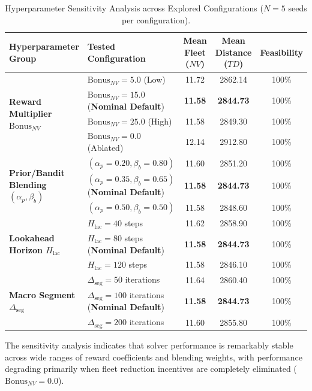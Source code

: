 \documentclass{article}
\begin{document}
\begin{table}[!htbp]
\caption{Hyperparameter Sensitivity Analysis across Explored Configurations ($N=5$ seeds per configuration).}
\label{tab:supp_sensitivity_matrix}
\centering
\small
\begin{tabularx}{\textwidth}{l l c c c}
\toprule
\textbf{Hyperparameter Group} & \textbf{Tested Configuration} & \textbf{Mean Fleet ($NV$)} & \textbf{Mean Distance ($TD$)} & \textbf{Feasibility} \\
\midrule
\multirow{4}{*}{\textbf{Reward Multiplier $\text{Bonus}_{NV}$}} 
 & $\text{Bonus}_{NV} = 5.0$ (Low) & 11.72 & 2862.14 & 100\% \\
 & $\text{Bonus}_{NV} = 15.0$ (\textbf{Nominal Default}) & \textbf{11.58} & \textbf{2844.73} & 100\% \\
 & $\text{Bonus}_{NV} = 25.0$ (High) & 11.58 & 2849.30 & 100\% \\
 & $\text{Bonus}_{NV} = 0.0$ (Ablated) & 12.14 & 2912.80 & 100\% \\
\midrule
\multirow{3}{*}{\textbf{Prior/Bandit Blending $(\alpha_p, \beta_b)$}} 
 & $(\alpha_p=0.20, \beta_b=0.80)$ & 11.60 & 2851.20 & 100\% \\
 & $(\alpha_p=0.35, \beta_b=0.65)$ (\textbf{Nominal Default}) & \textbf{11.58} & \textbf{2844.73} & 100\% \\
 & $(\alpha_p=0.50, \beta_b=0.50)$ & 11.58 & 2848.60 & 100\% \\
\midrule
\multirow{3}{*}{\textbf{Lookahead Horizon $H_{\text{lac}}$}} 
 & $H_{\text{lac}} = 40$ steps & 11.62 & 2858.90 & 100\% \\
 & $H_{\text{lac}} = 80$ steps (\textbf{Nominal Default}) & \textbf{11.58} & \textbf{2844.73} & 100\% \\
 & $H_{\text{lac}} = 120$ steps & 11.58 & 2846.10 & 100\% \\
\midrule
\multirow{3}{*}{\textbf{Macro Segment $\Delta_{\text{seg}}$}} 
 & $\Delta_{\text{seg}} = 50$ iterations & 11.64 & 2860.40 & 100\% \\
 & $\Delta_{\text{seg}} = 100$ iterations (\textbf{Nominal Default}) & \textbf{11.58} & \textbf{2844.73} & 100\% \\
 & $\Delta_{\text{seg}} = 200$ iterations & 11.60 & 2855.80 & 100\% \\
\bottomrule
\end{tabularx}
\end{table}

The sensitivity analysis indicates that solver performance is remarkably stable across wide ranges of reward coefficients and blending weights, with performance degrading primarily when fleet reduction incentives are completely eliminated ($\text{Bonus}_{NV} = 0.0$).
\end{document}
